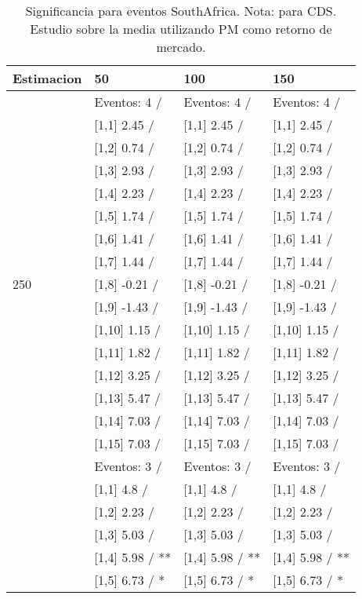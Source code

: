 \begin{table}

\caption{Significancia para eventos SouthAfrica. Nota: para CDS. Estudio sobre la media utilizando PM como retorno de mercado.}
\centering
\begin{tabular}[t]{llll}
\toprule
Estimacion & 50 & 100 & 150\\
\midrule
 & Eventos:  4 / & Eventos:  4 / & Eventos:  4 /\\
 & {}[1,1] 2.45  / & {}[1,1] 2.45  / & {}[1,1] 2.45  /\\
 & {}[1,2] 0.74  / & {}[1,2] 0.74  / & {}[1,2] 0.74  /\\
 & {}[1,3] 2.93  / & {}[1,3] 2.93  / & {}[1,3] 2.93  /\\
 & {}[1,4] 2.23  / & {}[1,4] 2.23  / & {}[1,4] 2.23  /\\
\addlinespace
 & {}[1,5] 1.74  / & {}[1,5] 1.74  / & {}[1,5] 1.74  /\\
 & {}[1,6] 1.41  / & {}[1,6] 1.41  / & {}[1,6] 1.41  /\\
 & {}[1,7] 1.44  / & {}[1,7] 1.44  / & {}[1,7] 1.44  /\\
250 & {}[1,8] -0.21  / & {}[1,8] -0.21  / & {}[1,8] -0.21  /\\
 & {}[1,9] -1.43  / & {}[1,9] -1.43  / & {}[1,9] -1.43  /\\
\addlinespace
 & {}[1,10] 1.15  / & {}[1,10] 1.15  / & {}[1,10] 1.15  /\\
 & {}[1,11] 1.82  / & {}[1,11] 1.82  / & {}[1,11] 1.82  /\\
 & {}[1,12] 3.25  / & {}[1,12] 3.25  / & {}[1,12] 3.25  /\\
 & {}[1,13] 5.47  / & {}[1,13] 5.47  / & {}[1,13] 5.47  /\\
 & {}[1,14] 7.03  / & {}[1,14] 7.03  / & {}[1,14] 7.03  /\\
\addlinespace
 & {}[1,15] 7.03  / & {}[1,15] 7.03  / & {}[1,15] 7.03  /\\
 & Eventos:  3 / & Eventos:  3 / & Eventos:  3 /\\
 & {}[1,1] 4.8  / & {}[1,1] 4.8  / & {}[1,1] 4.8  /\\
 & {}[1,2] 2.23  / & {}[1,2] 2.23  / & {}[1,2] 2.23  /\\
 & {}[1,3] 5.03  / & {}[1,3] 5.03  / & {}[1,3] 5.03  /\\
\addlinespace
 & {}[1,4] 5.98  / ** & {}[1,4] 5.98  / ** & {}[1,4] 5.98  / **\\
 & {}[1,5] 6.73  / * & {}[1,5] 6.73  / * & {}[1,5] 6.73  / *\\

\end{tabular}
\end{table}
